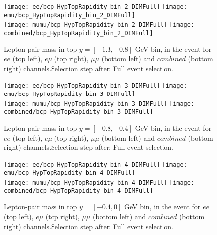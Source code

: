 \documentclass[12pt, a4paper, titlepage]{article}
\begin{document}
\begin{figure}
  \texttt{[image: ee/bcp\_HypTopRapidity\_bin\_2\_DIMFull]}
  \texttt{[image: emu/bcp\_HypTopRapidity\_bin\_2\_DIMFull]}\\
  \texttt{[image: mumu/bcp\_HypTopRapidity\_bin\_2\_DIMFull]}
  \texttt{[image: combined/bcp\_HypTopRapidity\_bin\_2\_DIMFull]}
\caption{Lepton-pair mass in top $y = [-1.3,-0.8]$ GeV bin, in the event for $ee$ (top left), $e\mu$ (top right), $\mu\mu$ (bottom left) and $combined$ (bottom right) channels.\newline Selection step after: Full event selection.}
\end{figure}

\clearpage
\newpage


\begin{figure}
  \texttt{[image: ee/bcp\_HypTopRapidity\_bin\_3\_DIMFull]}
  \texttt{[image: emu/bcp\_HypTopRapidity\_bin\_3\_DIMFull]}\\
  \texttt{[image: mumu/bcp\_HypTopRapidity\_bin\_3\_DIMFull]}
  \texttt{[image: combined/bcp\_HypTopRapidity\_bin\_3\_DIMFull]}
\caption{Lepton-pair mass in top $y = [-0.8,-0.4]$ GeV bin, in the event for $ee$ (top left), $e\mu$ (top right), $\mu\mu$ (bottom left) and $combined$ (bottom right) channels.\newline Selection step after: Full event selection.}
\end{figure}

\clearpage
\newpage

\begin{figure}
  \texttt{[image: ee/bcp\_HypTopRapidity\_bin\_4\_DIMFull]}
  \texttt{[image: emu/bcp\_HypTopRapidity\_bin\_4\_DIMFull]}\\
  \texttt{[image: mumu/bcp\_HypTopRapidity\_bin\_4\_DIMFull]}
  \texttt{[image: combined/bcp\_HypTopRapidity\_bin\_4\_DIMFull]}
\caption{Lepton-pair mass in top $y = [-0.4,0]$ GeV bin, in the event for $ee$ (top left), $e\mu$ (top right), $\mu\mu$ (bottom left) and $combined$ (bottom right) channels.\newline Selection step after: Full event selection.}
\end{figure}

\clearpage
\newpage
\end{document}
